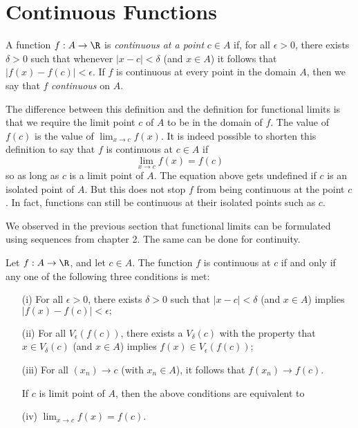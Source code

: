 \section{Continuous Functions}

\begin{tcolorbox}
    \begin{defn}[Continuity]
    A function \( f: A \to \R  \) is \textit{continuous at a point} \( c \in A  \) if, for all \( \epsilon > 0  \), there exists \( \delta > 0  \) such that whenever \( | x - c  | < \delta \) (and \( x \in A  \)) it follows that \( | f(x) - f(c) | < \epsilon  \). 
    If \( f \) is continuous at every point in the domain \( A  \), then we say that \( f \) \textit{continuous} on \( A  \).
    \end{defn}
\end{tcolorbox}

The difference between this definition and the definition for functional limits is that we require the limit point \( c  \) of \( A  \) to be in the domain of \(  f\). The value of \( f(c) \) is the value of \( \lim_{ x \to c } f(x)  \). It is indeed possible to shorten this definition to say that \( f  \) is continuous at \( c \in A  \) if 
\[  \lim_{ x \to c } f(x) = f(c) \tag{1}\]
so as long as \( c  \) is a limit point of \( A  \). The equation above gets undefined if \( c \) is an isolated point of \( A  \). But this does not stop \( f \) from being continuous at the point \( c \). In fact, functions can still be continuous at their isolated points such as \( c \).

We observed in the previous section that functional limits can be formulated using sequences from chapter 2. The same can be done for continuity. 

\begin{tcolorbox}
    \begin{thm}
    Let \( f: A \to \R  \), and let \( c \in A  \). The function \( f \) is continuous at \( c \) if and only if any one of the following three conditions is met:
    \begin{enumerate}
        \item[(i)] For all \( \epsilon > 0  \), there exists \( \delta > 0  \) such that \( | x - c  | < \delta \) (and \( x \in A  \)) implies \( | f(x) - f(c) | < \epsilon; \)
        \item[(ii)] For all \( V_{\epsilon }(f(c)) \), there exists a \( V_{\delta}(c)  \) with the property that \( x \in V_{\delta} (c) \) (and \( x \in A  \)) implies \( f(x) \in V_{\epsilon }(f(c))  \);
        \item[(iii)] For all \( (x_n) \to c \) (with \( x_n \in A
            \)), it follows that \( f(x_n) \to f(c) \).

            If \( c \) is limit point of \( A  \), then the above conditions are equivalent to 
    \item[(iv)] \( \lim_{ x \to c } f(x)  = f(c)\).
    \end{enumerate}
    \end{thm}
\end{tcolorbox}

